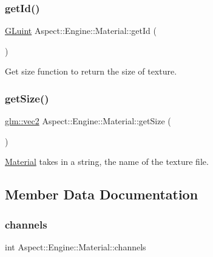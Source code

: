 \subsubsection{\texorpdfstring{get\+Id()}{getId()}}
{\footnotesize\ttfamily \mbox{\hyperlink{glew_8h_a68c4714e43d8e827d80759f9cb864f3c}{G\+Luint}} Aspect\+::\+Engine\+::\+Material\+::get\+Id (\begin{DoxyParamCaption}{ }\end{DoxyParamCaption})}



Get size function to return the size of texture. 

\mbox{\label{class_aspect_1_1_engine_1_1_material_a8779008ace71c3d1ee2cd551373933be}} 
\subsubsection{\texorpdfstring{get\+Size()}{getSize()}}
{\footnotesize\ttfamily \mbox{\hyperlink{group__core__types_gaa1618f51db67eaa145db101d8c8431d8}{glm\+::vec2}} Aspect\+::\+Engine\+::\+Material\+::get\+Size (\begin{DoxyParamCaption}{ }\end{DoxyParamCaption})}



\mbox{\hyperlink{class_aspect_1_1_engine_1_1_material}{Material}} takes in a string, the name of the texture file. 



\subsection{Member Data Documentation}
\mbox{\label{class_aspect_1_1_engine_1_1_material_ae0b4f29080da1fdfb87763c8b72f3110}} 
\subsubsection{\texorpdfstring{channels}{channels}}
{\footnotesize\ttfamily int Aspect\+::\+Engine\+::\+Material\+::channels}

